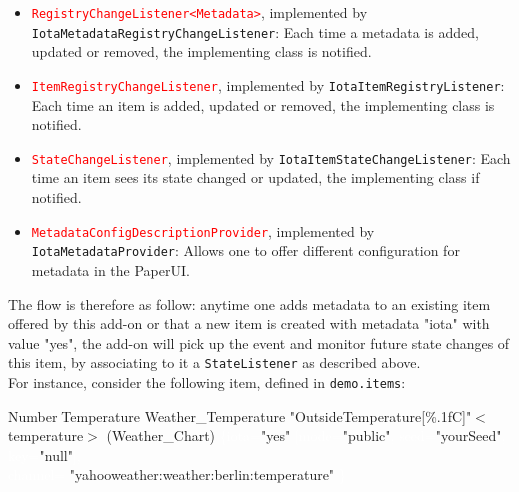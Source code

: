 \documentclass[a4paper,10pt]{article}
\begin{document}
\begin{itemize}
	\item \texttt{\textcolor{red}{RegistryChangeListener<Metadata>}}, implemented by \texttt{\textcolor{OliveGreen}{IotaMetadataRegistryChangeListener}}: Each time a metadata is added, updated or removed, the implementing class is notified.
	\item \texttt{\textcolor{red}{ItemRegistryChangeListener}}, implemented by \texttt{\textcolor{OliveGreen}{IotaItemRegistryListener}}: Each time an item is added, updated or removed, the implementing class is notified.
	\item \texttt{\textcolor{red}{StateChangeListener}}, implemented by \texttt{\textcolor{OliveGreen}{IotaItemStateChangeListener}}: Each time an item sees its state changed or updated, the implementing class if notified. 
	\item \texttt{\textcolor{red}{MetadataConfigDescriptionProvider}}, implemented by \texttt{\textcolor{OliveGreen}{IotaMetadataProvider}}: Allows one to offer different configuration for metadata in the PaperUI.
\end{itemize}

\noindent The flow is therefore as follow: anytime one adds metadata to an existing item offered by this add-on or that a new item is created with metadata "iota" with value "yes", the add-on will pick up the event and monitor future state changes of this item, by associating to it a \texttt{StateListener} as described above. \\

\noindent For instance, consider the following item, defined in \texttt{demo.items}:

\begin{center}
\begin{tcolorbox}
\textcolor{TypeItem}{Number}\textcolor{white}{:}\textcolor{TypeItem}{Temperature} \textcolor{NameItem}{Weather\_Temperature} \textcolor{DescriptionItem}{"OutsideTemperature[\%.1f\degree C]"}\textcolor{GroupItem}{$<$temperature$>$} \textcolor{FuncItem}{(Weather\_Chart)} \textcolor{white}{\{iota=}\textcolor{DescriptionItem}{"yes"} \textcolor{white}{[mode=}\textcolor{DescriptionItem}{"public"}\textcolor{white}{,} \textcolor{white}{seed=}\textcolor{DescriptionItem}{"yourSeed"}\textcolor{white}{,} \textcolor{white}{key=}\textcolor{DescriptionItem}{"null"}\textcolor{white}{]}\textcolor{white}{,} \\ \textcolor{white}{channel=} \textcolor{DescriptionItem}{"yahooweather:weather:berlin:temperature"} \textcolor{white}{\}}
\end{tcolorbox}

\end{center}
\end{document}
